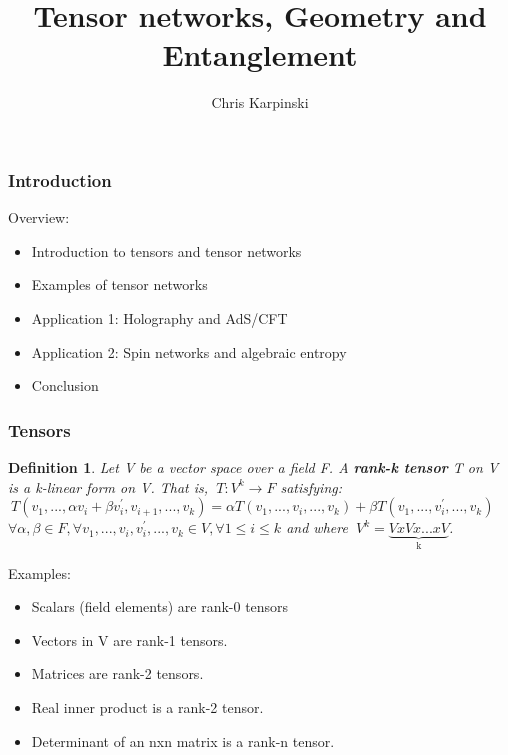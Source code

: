 \documentclass[11pt]{beamer}
\newcommand{\vs}{\vskip10pt}
\newtheorem{defn}[theorem]{Definition}
\begin{document}
	\author{Chris Karpinski}
	\title{Tensor networks, Geometry and Entanglement}
	\begin{frame}[plain]
		\maketitle
	\end{frame}
	
	\begin{frame}
		\frametitle{Introduction}
		
		Overview: 
		

		\begin{itemize}
		 
		\vs 
		\item Introduction to tensors and tensor networks
		\vs 
		\item Examples of tensor networks
		\vs 
		\item Application 1: Holography and AdS/CFT
		\vs 
		\item Application 2: Spin networks and algebraic entropy
		\vs
		 \item Conclusion
		
		\end{itemize}
		
	\end{frame}

\begin{frame}
	\frametitle{Tensors}
	
		\begin{defn}
			
			Let V be a vector space over a field F. A \textbf{rank-k tensor} T on V is a k-linear form on V. That is, $\ T:V^k \rightarrow F $ \fontsize{8}{1} satisfying: $\ T(v_1,...,\alpha v_i + \beta v_i^{'}, v_{i+1},...,v_k) = \alpha T(v_1,...,v_i,...,v_k) + \beta T(v_1,...,v_i^{'},...,v_k) $
			$\forall \alpha, \beta \in F, \forall v_1,...,v_i,v_i^{'},...,v_k \in V, \forall 1 \leq i \leq k  $ and where $\ V^k = \underbrace {VxVx...xV}_{\text{k}} $.
			
		\end{defn}	
	\vs
	Examples: 
	
	\begin {itemize}
	\item Scalars (field elements) are rank-0 tensors
	\item Vectors in V are rank-1 tensors. 
	\item Matrices are rank-2 tensors. 
	\item Real inner product is a rank-2 tensor.
	\item Determinant of an nxn matrix is a rank-n tensor. 
	
	\end {itemize}
	
\end{frame}
\end{document}
